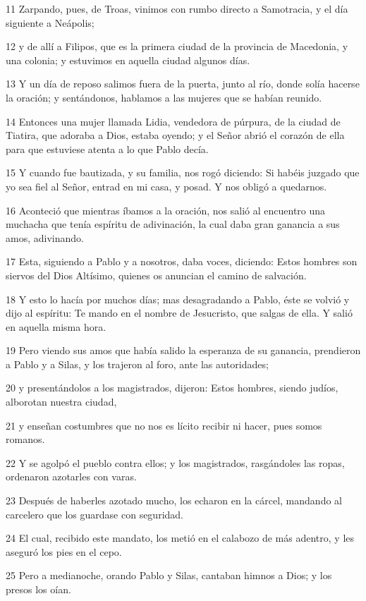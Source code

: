 \par 11 Zarpando, pues, de Troas, vinimos con rumbo directo a Samotracia, y el día siguiente a Neápolis;
\par 12 y de allí a Filipos, que es la primera ciudad de la provincia de Macedonia, y una colonia; y estuvimos en aquella ciudad algunos días.
\par 13 Y un día de reposo salimos fuera de la puerta, junto al río, donde solía hacerse la oración; y sentándonos, hablamos a las mujeres que se habían reunido.
\par 14 Entonces una mujer llamada Lidia, vendedora de púrpura, de la ciudad de Tiatira, que adoraba a Dios, estaba oyendo; y el Señor abrió el corazón de ella para que estuviese atenta a lo que Pablo decía.
\par 15 Y cuando fue bautizada, y su familia, nos rogó diciendo: Si habéis juzgado que yo sea fiel al Señor, entrad en mi casa, y posad. Y nos obligó a quedarnos.
\par 16 Aconteció que mientras íbamos a la oración, nos salió al encuentro una muchacha que tenía espíritu de adivinación, la cual daba gran ganancia a sus amos, adivinando.
\par 17 Esta, siguiendo a Pablo y a nosotros, daba voces, diciendo: Estos hombres son siervos del Dios Altísimo, quienes os anuncian el camino de salvación.
\par 18 Y esto lo hacía por muchos días; mas desagradando a Pablo, éste se volvió y dijo al espíritu: Te mando en el nombre de Jesucristo, que salgas de ella. Y salió en aquella misma hora.
\par 19 Pero viendo sus amos que había salido la esperanza de su ganancia, prendieron a Pablo y a Silas, y los trajeron al foro, ante las autoridades;
\par 20 y presentándolos a los magistrados, dijeron: Estos hombres, siendo judíos, alborotan nuestra ciudad,
\par 21 y enseñan costumbres que no nos es lícito recibir ni hacer, pues somos romanos.
\par 22 Y se agolpó el pueblo contra ellos; y los magistrados, rasgándoles las ropas, ordenaron azotarles con varas.
\par 23 Después de haberles azotado mucho, los echaron en la cárcel, mandando al carcelero que los guardase con seguridad.
\par 24 El cual, recibido este mandato, los metió en el calabozo de más adentro, y les aseguró los pies en el cepo.
\par 25 Pero a medianoche, orando Pablo y Silas, cantaban himnos a Dios; y los presos los oían.
